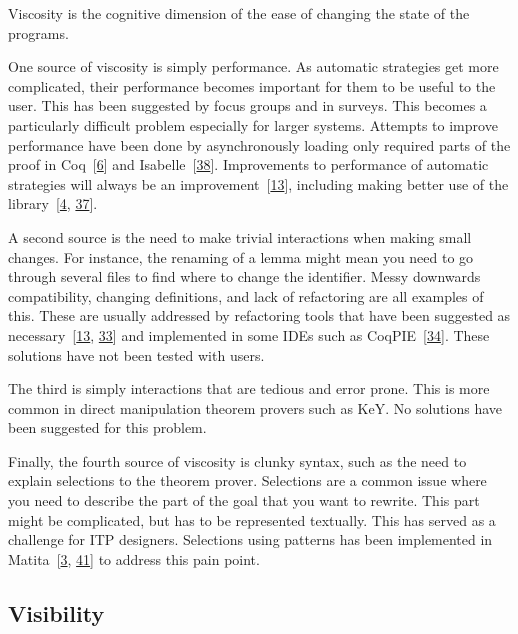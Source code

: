\documentclass[
]{article}
\begin{document}
Viscosity is the cognitive dimension of the ease of changing the state
of the programs.

One source of viscosity is simply performance. As automatic strategies
get more complicated, their performance becomes important for them to be
useful to the user. This has been suggested by focus groups and in
surveys. This becomes a particularly difficult problem especially for
larger systems. Attempts to improve performance have been done by
asynchronously loading only required parts of the proof in
Coq~{[}\protect\hyperlink{ref-barras_asynchronous_2015}{6}{]} and
Isabelle~{[}\protect\hyperlink{ref-wenzel_asynchronous_2014}{38}{]}.
Improvements to performance of automatic strategies will always be an
improvement~{[}\protect\hyperlink{ref-bourke_challenges_2012}{13}{]},
including making better use of the
library~{[}\protect\hyperlink{ref-asperti_considerations_2010}{4},
\protect\hyperlink{ref-tassi_interactive_2008}{37}{]}.

A second source is the need to make trivial interactions when making
small changes. For instance, the renaming of a lemma might mean you need
to go through several files to find where to change the identifier.
Messy downwards compatibility, changing definitions, and lack of
refactoring are all examples of this. These are usually addressed by
refactoring tools that have been suggested as
necessary~{[}\protect\hyperlink{ref-bourke_challenges_2012}{13},
\protect\hyperlink{ref-ringer_replica_2020}{33}{]} and implemented in
some IDEs such as
CoqPIE~{[}\protect\hyperlink{ref-roe_coqpie_2016}{34}{]}. These
solutions have not been tested with users.

The third is simply interactions that are tedious and error prone. This
is more common in direct manipulation theorem provers such as KeY. No
solutions have been suggested for this problem.

Finally, the fourth source of viscosity is clunky syntax, such as the
need to explain selections to the theorem prover. Selections are a
common issue where you need to describe the part of the goal that you
want to rewrite. This part might be complicated, but has to be
represented textually. This has served as a challenge for ITP designers.
Selections using patterns has been implemented in
Matita~{[}\protect\hyperlink{ref-asperti_user_2007}{3},
\protect\hyperlink{ref-zacchiroli_user_2007}{41}{]} to address this pain
point.

\hypertarget{visibility}{%
\subsection{Visibility}\label{visibility}}
\end{document}
